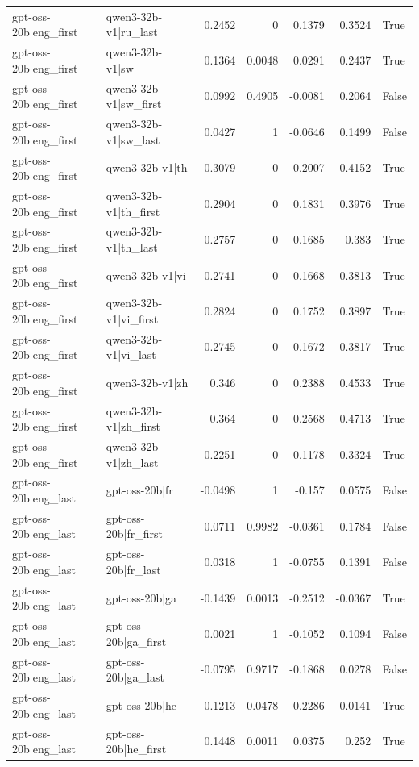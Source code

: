 \begin{table}
\begin{tabular}{l l r r r r l}
gpt-oss-20b|eng_first & qwen3-32b-v1|ru_last & 0.2452 & 0 & 0.1379 & 0.3524 & True \\
gpt-oss-20b|eng_first & qwen3-32b-v1|sw & 0.1364 & 0.0048 & 0.0291 & 0.2437 & True \\
gpt-oss-20b|eng_first & qwen3-32b-v1|sw_first & 0.0992 & 0.4905 & -0.0081 & 0.2064 & False \\
gpt-oss-20b|eng_first & qwen3-32b-v1|sw_last & 0.0427 & 1 & -0.0646 & 0.1499 & False \\
gpt-oss-20b|eng_first & qwen3-32b-v1|th & 0.3079 & 0 & 0.2007 & 0.4152 & True \\
gpt-oss-20b|eng_first & qwen3-32b-v1|th_first & 0.2904 & 0 & 0.1831 & 0.3976 & True \\
gpt-oss-20b|eng_first & qwen3-32b-v1|th_last & 0.2757 & 0 & 0.1685 & 0.383 & True \\
gpt-oss-20b|eng_first & qwen3-32b-v1|vi & 0.2741 & 0 & 0.1668 & 0.3813 & True \\
gpt-oss-20b|eng_first & qwen3-32b-v1|vi_first & 0.2824 & 0 & 0.1752 & 0.3897 & True \\
gpt-oss-20b|eng_first & qwen3-32b-v1|vi_last & 0.2745 & 0 & 0.1672 & 0.3817 & True \\
gpt-oss-20b|eng_first & qwen3-32b-v1|zh & 0.346 & 0 & 0.2388 & 0.4533 & True \\
gpt-oss-20b|eng_first & qwen3-32b-v1|zh_first & 0.364 & 0 & 0.2568 & 0.4713 & True \\
gpt-oss-20b|eng_first & qwen3-32b-v1|zh_last & 0.2251 & 0 & 0.1178 & 0.3324 & True \\
gpt-oss-20b|eng_last & gpt-oss-20b|fr & -0.0498 & 1 & -0.157 & 0.0575 & False \\
gpt-oss-20b|eng_last & gpt-oss-20b|fr_first & 0.0711 & 0.9982 & -0.0361 & 0.1784 & False \\
gpt-oss-20b|eng_last & gpt-oss-20b|fr_last & 0.0318 & 1 & -0.0755 & 0.1391 & False \\
gpt-oss-20b|eng_last & gpt-oss-20b|ga & -0.1439 & 0.0013 & -0.2512 & -0.0367 & True \\
gpt-oss-20b|eng_last & gpt-oss-20b|ga_first & 0.0021 & 1 & -0.1052 & 0.1094 & False \\
gpt-oss-20b|eng_last & gpt-oss-20b|ga_last & -0.0795 & 0.9717 & -0.1868 & 0.0278 & False \\
gpt-oss-20b|eng_last & gpt-oss-20b|he & -0.1213 & 0.0478 & -0.2286 & -0.0141 & True \\
gpt-oss-20b|eng_last & gpt-oss-20b|he_first & 0.1448 & 0.0011 & 0.0375 & 0.252 & True \\

\end{tabular}
\end{table}
